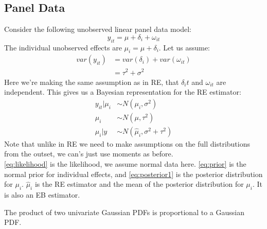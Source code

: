 \documentclass[DIV=14,titlepage=false]{scrreprt}
\begin{document}
\subsection{Panel Data}
Consider the following unobserved linear panel data model:
\[
    y_{it} = \mu + \delta_i +\omega_{it}
\]
The individual unobserved effects are $\mu_i = \mu + \delta_i$. Let us assume:
\begin{align*}
    var(y_{it}) & = var(\delta_i) + var(\omega_{it}) \\
    &= \tau^2 + \sigma^2
\end{align*}
Here we're making the same assumption as in RE, that $\delta_it$ and $\omega_{it}$ are independent. This gives us a Bayesian representation for the RE estimator:
\begin{align}
    y_{it}|\mu_i & \sim N(\mu_i, \sigma^2) \label{eq:likelihood}\\
    \mu_i & \sim N(\mu, \tau^2) \label{eq:prior}\\
    \mu_i | y &\sim N(\hat \mu_i, \sigma^2 + \tau^2) \label{eq:posterior1}
\end{align}
Note that unlike in RE we need to make assumptions on the full distributions from the outset, we can's just use moments as before.\\
\eqref{eq:likelihood} is the likelihood, we assume normal data here. \eqref{eq:prior} is the normal prior for individual effects, and \eqref{eq:posterior1} is the posterior distribution for $\mu_i$. $\hat \mu_i$ is the RE estimator and the mean of the posterior distribution for $\mu_i$. It is also an EB estimator.
\begin{claim}\label{claim:product_gaussian}
The product of two univariate Gaussian PDFs is proportional to a Gaussian PDF.
\end{claim}
\end{document}
